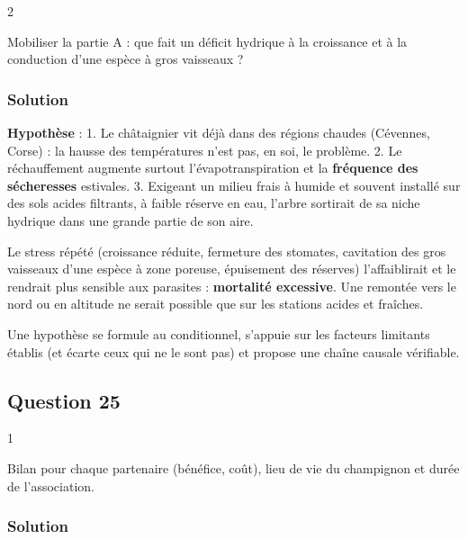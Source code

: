 \documentclass[11pt,a4paper]{article}
\begin{document}
\begin{indication}{2}

Mobiliser la partie A : que fait un déficit hydrique à la croissance et à la conduction d'une espèce à gros vaisseaux ?

\end{indication}

\hypertarget{solution-23}{%
\subsubsection{Solution}\label{solution-23}}

\textbf{Hypothèse} :
1. Le châtaignier vit déjà dans des régions chaudes (Cévennes, Corse) : la hausse des températures n'est pas, en soi, le problème.
2. Le réchauffement augmente surtout l'évapotranspiration et la \textbf{fréquence des sécheresses} estivales.
3. Exigeant un milieu frais à humide et souvent installé sur des sols acides filtrants, à faible réserve en eau, l'arbre sortirait de sa niche hydrique dans une grande partie de son aire.

Le stress répété (croissance réduite, fermeture des stomates, cavitation des gros vaisseaux d'une espèce à zone poreuse, épuisement des réserves) l'affaiblirait et le rendrait plus sensible aux parasites : \textbf{mortalité excessive}. Une remontée vers le nord ou en altitude ne serait possible que sur les stations acides et fraîches.

\begin{methode}

Une hypothèse se formule au conditionnel, s'appuie sur les facteurs limitants établis (et écarte ceux qui ne le sont pas) et propose une chaîne causale vérifiable.

\end{methode}

\hypertarget{question-25}{%
\subsection{Question 25}\label{question-25}}

\begin{indication}{1}

Bilan pour chaque partenaire (bénéfice, coût), lieu de vie du champignon et durée de l'association.

\end{indication}

\hypertarget{solution-24}{%
\subsubsection{Solution}\label{solution-24}}
\end{document}
